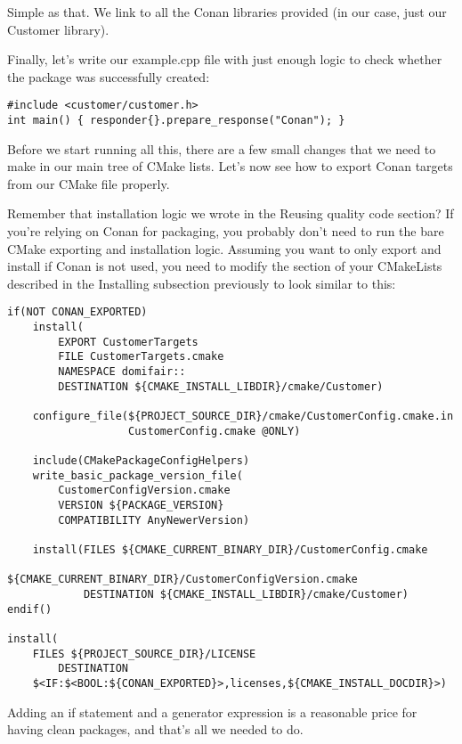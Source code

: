 Simple as that. We link to all the Conan libraries provided (in our case, just our Customer library).

Finally, let's write our example.cpp file with just enough logic to check whether the package was successfully created:

\begin{lstlisting}[style=styleCXX]
#include <customer/customer.h>
int main() { responder{}.prepare_response("Conan"); }
\end{lstlisting}

Before we start running all this, there are a few small changes that we need to make in our main tree of CMake lists. Let's now see how to export Conan targets from our CMake file properly. 


Remember that installation logic we wrote in the Reusing quality code section? If you're relying on Conan for packaging, you probably don't need to run the bare CMake exporting and installation logic. Assuming you want to only export and install if Conan is not used, you need to modify the section of your CMakeLists described in the Installing subsection previously to look similar to this:

\begin{lstlisting}[style=styleCMake]
if(NOT CONAN_EXPORTED)
	install(
		EXPORT CustomerTargets
		FILE CustomerTargets.cmake
		NAMESPACE domifair::
		DESTINATION ${CMAKE_INSTALL_LIBDIR}/cmake/Customer)
	
	configure_file(${PROJECT_SOURCE_DIR}/cmake/CustomerConfig.cmake.in
				   CustomerConfig.cmake @ONLY)
	
	include(CMakePackageConfigHelpers)
	write_basic_package_version_file(
		CustomerConfigVersion.cmake
		VERSION ${PACKAGE_VERSION}
		COMPATIBILITY AnyNewerVersion)
	
	install(FILES ${CMAKE_CURRENT_BINARY_DIR}/CustomerConfig.cmake
				${CMAKE_CURRENT_BINARY_DIR}/CustomerConfigVersion.cmake
			DESTINATION ${CMAKE_INSTALL_LIBDIR}/cmake/Customer)
endif()

install(
	FILES ${PROJECT_SOURCE_DIR}/LICENSE
	 	DESTINATION
	$<IF:$<BOOL:${CONAN_EXPORTED}>,licenses,${CMAKE_INSTALL_DOCDIR}>)
\end{lstlisting}

Adding an if statement and a generator expression is a reasonable price for having clean packages, and that's all we needed to do.

